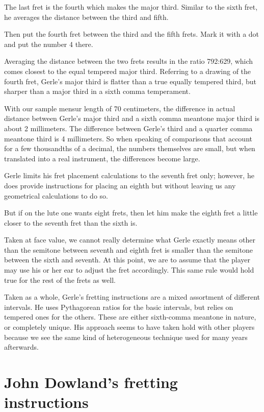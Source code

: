 The last fret is the fourth which makes the major third.  Similar to the sixth fret, he
averages the distance between the third and fifth.
\begin{blocks}
Then put the fourth fret between the third and the fifth frets.  Mark it with a
dot and put the number 4 there.
\end{blocks}
Averaging the distance between the two frets results in the ratio 792:629, which comes
closest to the equal tempered major third. Referring to a drawing of the fourth fret,
Gerle's major third is flatter than a true equally tempered third, but sharper than a
major third in a sixth comma temperament.

With our sample mensur length of 70 centimeters, the difference in actual distance
between Gerle's major third and a sixth comma meantone major third is about 2
millimeters.  The difference between Gerle's third and a quarter comma meantone third
is 4 millimeters. So when speaking of comparisons that account for a few thousandths of
a decimal, the numbers themselves are small, but when translated into a real
instrument, the differences become large.

Gerle limits his fret placement calculations to the seventh fret only; however,
he does provide instructions for placing an eighth but without leaving us any
geometrical calculations to do so.
\begin{blocks}
But if on the lute one wants eight frets, then let him make the eighth fret a
little closer to the seventh fret than the sixth is.
\end{blocks}
Taken at face value, we cannot really determine what Gerle exactly means other
than the semitone between seventh and eighth fret is smaller than the semitone
between the sixth and seventh.  At this point, we are to assume that the player
may use his or her ear to adjust the fret accordingly.  This same rule would
hold true for the rest of the frets as well.

Taken as a whole, Gerle's fretting instructions are a mixed assortment of different
intervals.  He uses Pythagorean ratios for the basic intervals, but relies on tempered
ones for the others.  These are either sixth-comma meantone in nature, or completely
unique.  His approach seems to have taken hold with other players because we see the
same kind of heterogeneous technique used for many years afterwards.

%
%
\section{John Dowland's fretting instructions}


